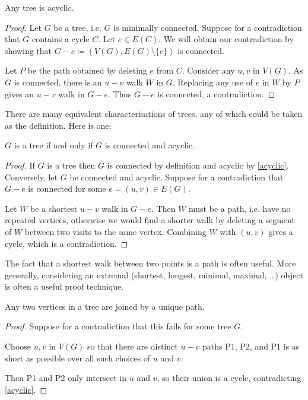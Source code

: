\begin{lemma}\label{acyclic}
Any tree is acyclic.
\end{lemma}

\begin{proof}
Let $G$ be a tree, i.e. $G$ is minimally connected. Suppose for a contradiction that $G$ contains a cycle $C$. Let $e \in E(C)$. We will obtain our contradiction by showing that $G-e \coloneqq (V(G),E(G)\setminus\{e\})$ is connected. 

Let $P$ be the path obtained by deleting $e$ from $C$. Consider any $u,v$ in $V(G)$. As $G$ is connected, there is an $u-v$ walk $W$ in $G$. Replacing any use of $e$ in $W$ by $P$ gives an $u-v$ walk in $G-e$. Thus $G-e$ is connected, a contradiction.
\end{proof}

There are many equivalent characterisations of trees, any of which could be taken as the definition. Here is one:

\begin{lemma}\label{tree_iff}
$G$ is a tree if and only if $G$ is connected and acyclic.
\end{lemma}
\begin{proof}
If $G$ is a tree then $G$ is connected by definition and acyclic by \cref{acyclic}. Conversely, let $G$ be connected and acyclic. Suppose for a contradiction that $G-e$ is connected for some $e = (u,v) \in E(G)$.

Let $W$ be a shortest $u-v$ walk in $G-e$. Then $W$ must be a path, i.e. have no repeated vertices, otherwise we would find a shorter walk by deleting a segment of $W$ between two visits to the same vertex. Combining $W$ with $(u,v)$ gives a cycle, which is a contradiction.
\end{proof}

\begin{remark}
The fact that a shortest walk between two points is a path is often useful. More generally, considering an extremal (shortest, longest, minimal, maximal, \dots) object is often a useful proof technique.
\end{remark}

\begin{lemma}
Any two vertices in a tree are joined by a unique path.
\end{lemma}

\begin{proof}
Suppose for a contradiction that this fails for some tree $G$. 

Choose $u,v$ in $V(G)$ so that there are distinct $u-v$ paths P1, P2, and P1 is as short as possible over all such choices of $u$ and $v$.

Then P1 and P2 only intersect in $u$ and $v$, so their union is a cycle, contradicting \cref{acyclic}.
\end{proof}

